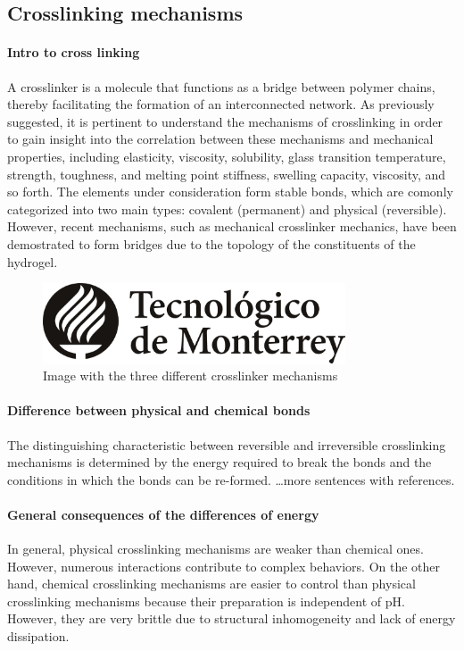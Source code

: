 \subsection{Crosslinking mechanisms}\label{ch1:Cross-linking}

\paragraph{Intro to cross linking}
A crosslinker is a molecule that functions as a bridge between polymer chains, thereby facilitating the formation of an interconnected network.
As previously suggested, it is pertinent to understand the mechanisms of crosslinking in order to gain insight into the correlation between these mechanisms and mechanical properties, including elasticity, viscosity, solubility, glass transition temperature, strength, toughness, and melting point stiffness, swelling capacity, viscosity, and so forth\citep{priyaComprehensiveReviewHydrogel2024}.
The elements under consideration form stable bonds, which are comonly categorized into two main types: covalent (permanent) and physical (reversible)\citep{bustamante-torresHydrogelsClassificationAccording2021}.
However, recent mechanisms, such as mechanical crosslinker mechanics, have been demostrated to form bridges due to the topology of the constituents of the hydrogel.

\begin{figure}[!h]
    \centering
    \includegraphics[width=0.8\textwidth]{pics/LogoTec.jpg}
    \caption{Image with the three different crosslinker mechanisms}
\end{figure}

\paragraph{Difference between physical and chemical bonds}
The distinguishing characteristic between reversible and irreversible crosslinking mechanisms is determined by the energy required to break the bonds and the conditions in which the bonds can be re-formed.
\dots more sentences with references.

\paragraph{General consequences of the differences of energy}
In general, physical crosslinking mechanisms are weaker than chemical ones.
However, numerous interactions contribute to complex behaviors\citep{bustamante-torresHydrogelsClassificationAccording2021}.
On the other hand, chemical crosslinking mechanisms are easier to control than physical crosslinking mechanisms because their preparation is independent of pH\citep{bustamante-torresHydrogelsClassificationAccording2021}. 
However, they are very brittle due to structural inhomogeneity and lack of energy dissipation\citep{xuRoleChemicalPhysical2018}.



